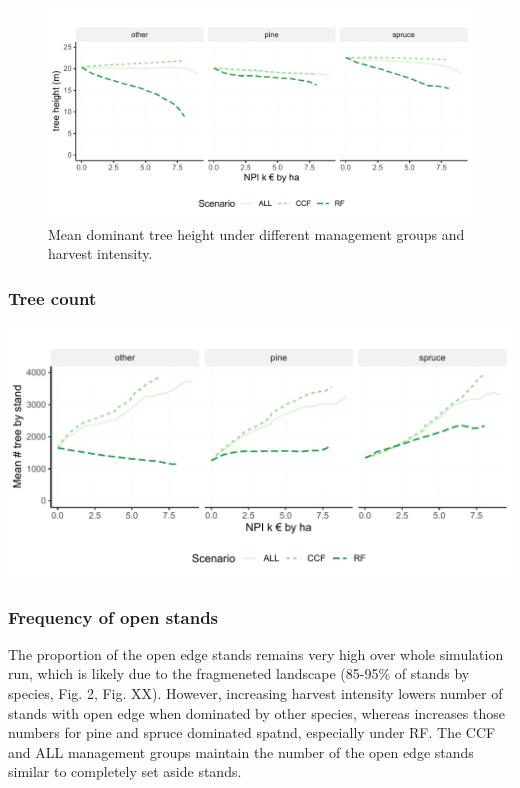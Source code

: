 \documentclass[]{elsarticle} %
\makeatletter
\def\maxwidth{\ifdim\Gin@nat@width>\linewidth\linewidth
\else\Gin@nat@width\fi}
\let\Oldincludegraphics\includegraphics
\renewcommand{\includegraphics}[1]{\Oldincludegraphics[width=\maxwidth]{#1}}
\makeatother
\begin{document}
\begin{figure}
\centering
\includegraphics{test_manus_files/figure-latex/res_D_tree_height-1.pdf}
\caption{Mean dominant tree height under different management groups and
harvest intensity.}
\end{figure}

\subsubsection{Tree count}\label{tree-count}

\includegraphics{test_manus_files/figure-latex/mean_tree_n-1.pdf}

\subsubsection{Frequency of open stands}\label{frequency-of-open-stands}

The proportion of the open edge stands remains very high over whole
simulation run, which is likely due to the fragmeneted landscape
(85-95\% of stands by species, Fig. 2, Fig. XX). However, increasing
harvest intensity lowers number of stands with open edge when dominated
by other species, whereas increases those numbers for pine and spruce
dominated spatnd, especially under RF. The CCF and ALL management groups
maintain the number of the open edge stands similar to completely set
aside stands.
\end{document}
